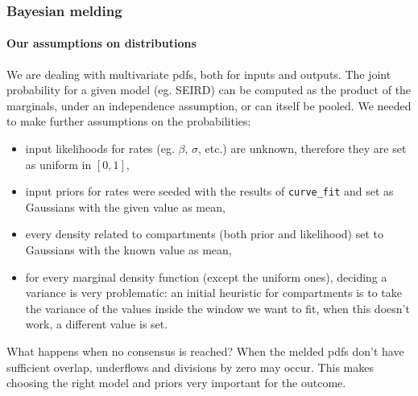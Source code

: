 \documentclass[aspectratio=43]{beamer}
\begin{document}
\begin{frame}
	\frametitle{Bayesian melding}
	\framesubtitle{Our assumptions on distributions}
	We are dealing with multivariate pdfs, both for inputs and outputs. The joint probability for a given model (eg. SEIRD) can be computed as the product of the marginals, under an independence assumption, or can itself be pooled. We needed to make further assumptions on the probabilities:
	\begin{itemize}
		\item input likelihoods for rates (eg. $\beta$, $\sigma$, etc.) are unknown, therefore they are set as uniform in $[0, 1]$,
		\item input priors for rates were seeded with the results of \texttt{curve\_fit} and set as Gaussians with the given value as mean,
		\item every density related to compartments (both prior and likelihood) set to Gaussians with the known value as mean,
		\item for every marginal density function (except the uniform ones), deciding a variance is very problematic: an initial heuristic for compartments is to take the variance of the values inside the window we want to fit, when this doesn't work, a different value is set.
	\end{itemize}
	
	
	\begin{alertblock}{What happens when no consensus is reached?}
		When the melded pdfs don't have sufficient overlap, underflows and divisions by zero may occur. This makes choosing the right model and priors very important for the outcome.
	\end{alertblock}
\end{frame}
\end{document}

